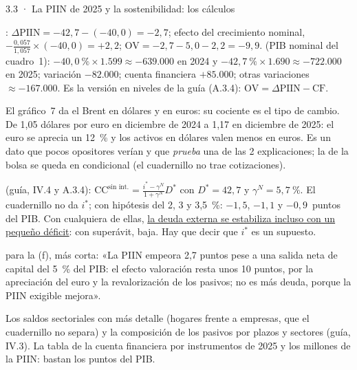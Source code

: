 \begin{complemento}{3.3 · La PIIN de 2025 y la sostenibilidad: los cálculos}
\begin{figuracaja}
\caption{De la PIIN de 2024 a la de 2025 (\% del PIB)}\label{fig:s06}
\end{figuracaja}

: $\Delta\mathrm{PIIN}=-42{,}7-(-40{,}0)=-2{,}7$; efecto del crecimiento nominal, $-\frac{0{,}057}{1{,}057}\times(-40{,}0)=+2{,}2$; $\mathrm{OV}=-2{,}7-5{,}0-2{,}2=-9{,}9$.  (PIB nominal del cuadro~1): $-40{,}0~\%\times1.599\approx-639.000$ en 2024 y $-42{,}7~\%\times1.690\approx-722.000$ en 2025; variación $-82.000$; cuenta financiera $+85.000$; otras variaciones $\approx-167.000$. Es la versión en niveles de la guía (A.3.4): $\mathrm{OV}=\Delta\mathrm{PIIN}-\mathrm{CF}$.

 El gráfico~7 da el Brent en dólares y en euros: su cociente es el tipo de cambio. De 1,05 dólares por euro en diciembre de 2024 a 1,17 en diciembre de 2025: el euro se aprecia un 12~\% y los activos en dólares valen menos en euros. Es un dato que pocos opositores verían y que \emph{prueba} una de las 2 explicaciones; la de la bolsa se queda en condicional (el cuadernillo no trae cotizaciones).

 (guía, IV.4 y A.3.4): $\mathrm{CC}^{\text{sin int.}}=\frac{i^*-\gamma^N}{1+\gamma^N}D^*$ con $D^*=42{,}7$ y $\gamma^N=5{,}7~\%$. El cuadernillo no da $i^*$; con hipótesis del 2, 3 y 3,5~\%: $-1{,}5$, $-1{,}1$ y $-0{,}9$~puntos del PIB. Con cualquiera de ellas, \uline{la deuda externa se estabiliza incluso con un pequeño déficit}: con superávit, baja. Hay que decir que $i^*$ es un supuesto.

 para la (f), más corta: «La PIIN empeora 2,7 puntos pese a una salida neta de capital del 5~\% del PIB: el efecto valoración resta unos 10 puntos, por la apreciación del euro y la revalorización de los pasivos; no es más deuda, porque la PIIN exigible mejora».

 Los saldos sectoriales con más detalle (hogares frente a empresas, que el cuadernillo no separa) y la composición de los pasivos por plazos y sectores (guía, IV.3).  La tabla de la cuenta financiera por instrumentos de 2025 y los millones de la PIIN: bastan los puntos del PIB.
\end{complemento}
